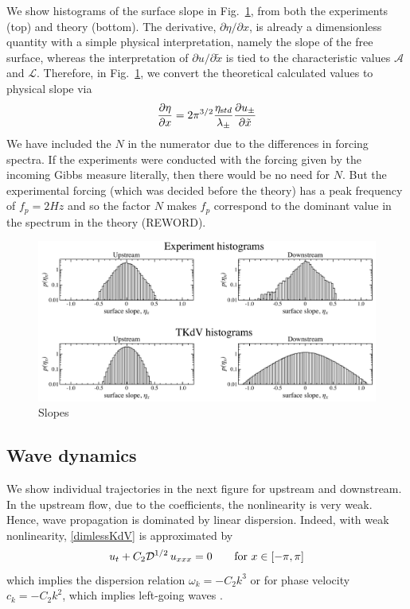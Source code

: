 \documentclass[11pt]{article}
\newcommand{\pd}[2]    { \frac{\partial #1} {\partial #2} }
\newcommand{\freqp}{f_p}
\newcommand{\etastd}{\eta_{\text std}}
\newcommand{\lam}{\lambda}
\newcommand{\lamupdn}{\lam_{\pm}}
\newcommand{\lamfac}{N}
\newcommand{\drat}{\mathcal{D}}
\newcommand{\ampscale}{\mathcal{A}}
\newcommand{\lengthscale}{\mathcal{L}}
\newcommand{\uupdn}{u_{\pm}}
\begin{document}
We show histograms of the surface slope in Fig.~\ref{slopehist}, from both the experiments (top) and theory (bottom). The derivative, $\partial \eta / \partial x$, is already a dimensionless quantity with a simple physical interpretation, namely the slope of the free surface, whereas the interpretation of $\partial u/\partial \tilde{x}$ is tied to the characteristic values $\ampscale$ and $\lengthscale$. 
Therefore, in Fig.~\ref{slopehist}, we convert the theoretical calculated values to physical slope via
\begin{equation}
\pd{\eta}{x} = 2 \pi^{3/2} \frac{\etastd}{\lamupdn} \pd{\uupdn}{\tilde{x}}
\end{equation}
We have included the $\lamfac$ in the numerator due to the differences in forcing spectra. If the experiments were conducted with the forcing given by the incoming Gibbs measure literally, then there would be no need for $\lamfac$. But the experimental forcing (which was decided before the theory) has a peak frequency of $\freqp = 2 Hz$ and so the factor $\lamfac$ makes $\freqp$ correspond to the dominant value in the spectrum in the theory (REWORD).


\begin{figure}%
\begin{center}
\includegraphics[width = 0.99 \linewidth]{Figs/slopehist.pdf}
\caption{
Slopes
}
\label{slopehist}
\end{center}
\end{figure}

\subsection{Wave dynamics}

We show individual trajectories in the next figure for upstream and downstream. In the upstream flow, due to the coefficients, the nonlinearity is very weak. Hence, wave propagation is dominated by linear dispersion. Indeed, with weak nonlinearity, \eqref{dimlessKdV} is approximated by
\begin{equation}
u_t + C_2 \drat^{1/2} \, u_{xxx} = 0
\qquad \text{for } x \in [-\pi,\pi] \\
\end{equation}
which implies the dispersion relation $\omega_k = -C_2 k^3$ or for phase velocity $c_k = -C_2 k^2$, which implies left-going waves \cite{majdaqi2019}.
\end{document}
